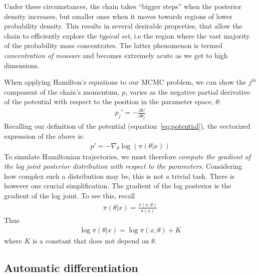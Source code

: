 \documentclass[11pt]{article}
\begin{document}
  Under these circumstances, the chain takes ``bigger steps'' when the posterior density increases, 
  but smaller ones when it moves towards regions of lower probability density. This results in several
  desirable properties, that allow the chain to efficiently explore the \textit{typical set}, i.e the region 
  where the vast majority of the probability mass concentrates.
  The latter phenomenon is termed \textit{concentration of measure} and becomes extremely acute
  as we get to high dimensions.
  
  When applying Hamilton's equations to our MCMC problem, we can show the $j^{th}$ 
  component of the chain's momentum, $p$, varies as the negative partial derivative of 
  the potential with respect to the position in the parameter space, $\theta$:
  \begin{eqnarray*}
    p_j' = - \frac{\partial{U}}{\partial{\theta_j}}
  \end{eqnarray*}
  Recalling our definition of the potential (equation~\ref{eq:potential}), the vectorized 
  expression of the above is:
  \begin{eqnarray}
    p' = - \nabla_\theta \log(\pi(\theta | x))
  \label{eq:gradient}
  \end{eqnarray}
  To simulate Hamiltonian trajectories, we must therefore \textit{compute the gradient 
  of the log joint posterior distribution with respect to the parameters}.
  Considering how complex such a distribution may be, this is not a trivial task.
  There is however one crucial simplification.
  The gradient of the log posterior is the gradient of the log joint.
  To see this, recall
  \begin{eqnarray*}
    \pi(\theta | x) = \frac{\pi (x, \theta)}{\pi(x)}
  \end{eqnarray*}
  Thus
  \begin{eqnarray*}
    \log \pi(\theta | x) = \log \pi(x, \theta) + K
  \end{eqnarray*}
  where $K$ is a constant that does not depend on $\theta$.
  
  \subsection{Automatic differentiation}
\end{document}

